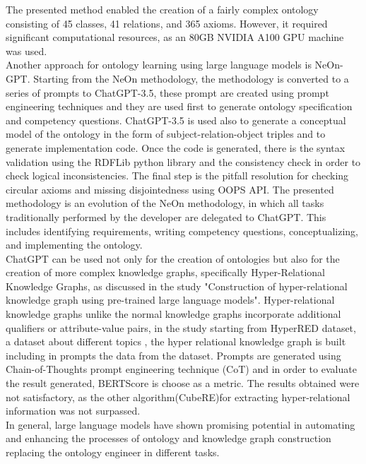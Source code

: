 The presented method enabled the creation of a fairly complex ontology consisting of 45 classes, 41 relations, and 365 axioms. However, it required significant computational resources, as an 80GB NVIDIA A100 GPU machine was used. \\
Another approach for ontology learning using large language models is NeOn-GPT.\cite{fathallah2024neon} Starting from the NeOn methodology, the methodology is converted to a series of prompts to ChatGPT-3.5, these prompt are created using prompt engineering techniques and they are used first to generate ontology specification and competency questions. ChatGPT-3.5 is used also to generate a conceptual model of the ontology in the form of subject-relation-object triples and to generate implementation code. Once the code is generated, there is the syntax validation using the RDFLib python library\cite{rdflib} and the consistency check in order to check logical inconsistencies. The final step is the pitfall resolution for checking circular axioms and missing disjointedness using OOPS API. The presented methodology is an evolution of the NeOn methodology, in which all tasks traditionally performed by the developer are delegated to ChatGPT. This includes identifying requirements, writing competency questions, conceptualizing, and implementing the ontology.\\
ChatGPT can be used not only for the creation of ontologies but also for the creation of more complex knowledge graphs, specifically Hyper-Relational Knowledge Graphs, as discussed in the study "Construction of hyper-relational knowledge graph using pre-trained large language models".\cite{datta2024construction} Hyper-relational knowledge graphs unlike the normal knowledge graphs incorporate additional qualifiers or attribute-value pairs\cite{hyper}, in the study starting from HyperRED dataset, a dataset about different topics , the hyper relational knowledge graph is built including in prompts the data from the dataset. Prompts are generated using Chain-of-Thoughts prompt engineering technique (CoT) and in order to evaluate the result generated, BERTScore is choose as a metric. The results obtained were not satisfactory, as the other algorithm(CubeRE)for extracting hyper-relational information was not surpassed.\\
In general, large language models have shown promising potential  in automating and enhancing the processes of ontology and knowledge graph construction replacing the ontology engineer in different tasks.

\newpage
